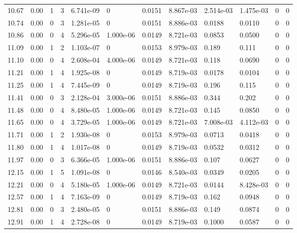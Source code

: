 \documentclass[preview]{standalone}
\begin{document}
{{{\begin{tabular}{L{1.2cm}C{1.2cm} C{0.3cm}C{0.5cm} C{1.4cm}C{1.4cm} C{1.4cm}C{1.4cm} C{1.6cm}C{1.6cm} C{1.6cm}C{1.6cm}}
  10.67  &  0.00  & 1     &  3 &  6.741e-09  & 0  &  0.0151&   8.867e-03& 2.514e-03 & 1.475e-03   &  0 & 0  \\ 
  10.74  &  0.00  & 0     &  3 &  1.281e-05  & 0  &  0.0151&   8.886e-03& 0.0188 & 0.0110   &  0 & 0  \\ 
  10.86  &  0.00  & 0     &  4 &  5.296e-05  & 1.000e-06  &  0.0149&   8.721e-03& 0.0853 & 0.0500   &  0 & 0  \\ 
  11.09  &  0.00  & 1     &  2 &  1.103e-07  & 0  &  0.0153&   8.979e-03& 0.189 & 0.111   &  0 & 0  \\ 
  11.10  &  0.00  & 0     &  4 &  2.608e-04  & 4.000e-06  &  0.0149&   8.721e-03& 0.118 & 0.0690   &  0 & 0  \\ 
  11.21  &  0.00  & 1     &  4 &  1.925e-08  & 0  &  0.0149&   8.719e-03& 0.0178 & 0.0104   &  0 & 0  \\ 
  11.25  &  0.00  & 1     &  4 &  7.445e-09  & 0  &  0.0149&   8.719e-03& 0.196 & 0.115   &  0 & 0  \\ 
  11.41  &  0.00  & 0     &  3 &  2.128e-04  & 3.000e-06  &  0.0151&   8.886e-03& 0.344 & 0.202   &  0 & 0  \\ 
  11.48  &  0.00  & 0     &  4 &  8.480e-05  & 1.000e-06  &  0.0149&   8.721e-03& 0.145 & 0.0850   &  0 & 0  \\ 
  11.65  &  0.00  & 0     &  4 &  3.729e-05  & 1.000e-06  &  0.0149&   8.721e-03& 7.008e-03 & 4.112e-03   &  0 & 0  \\ 
  11.71  &  0.00  & 1     &  2 &  1.930e-08  & 0  &  0.0153&   8.979e-03& 0.0713 & 0.0418   &  0 & 0  \\ 
  11.80  &  0.00  & 1     &  4 &  1.017e-08  & 0  &  0.0149&   8.719e-03& 0.0532 & 0.0312   &  0 & 0  \\ 
  11.97  &  0.00  & 0     &  3 &  6.366e-05  & 1.000e-06  &  0.0151&   8.886e-03& 0.107 & 0.0627   &  0 & 0  \\ 
  12.15  &  0.00  & 1     &  5 &  1.091e-08  & 0  &  0.0146&   8.540e-03& 0.0349 & 0.0205   &  0 & 0  \\ 
  12.21  &  0.00  & 0     &  4 &  5.180e-05  & 1.000e-06  &  0.0149&   8.721e-03& 0.0144 & 8.428e-03   &  0 & 0  \\ 
  12.57  &  0.00  & 1     &  4 &  7.163e-09  & 0  &  0.0149&   8.719e-03& 0.162 & 0.0948   &  0 & 0  \\ 
  12.81  &  0.00  & 0     &  3 &  2.480e-05  & 0  &  0.0151&   8.886e-03& 0.149 & 0.0874   &  0 & 0  \\ 
  12.91  &  0.00  & 1     &  4 &  2.728e-08  & 0  &  0.0149&   8.719e-03& 0.1000 & 0.0587   &  0 & 0  \\ 

\end{tabular}}}}
\end{document}

